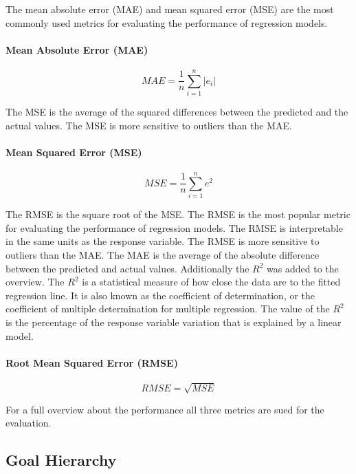 The mean absolute error (MAE) and mean squared error (MSE) are the most commonly used metrics for evaluating the performance of regression models. \paragraph*{Mean Absolute Error (MAE)}

\begin{equation}
    \label{eq:mae}
    MAE = \frac{1}{n} \sum_{i=1}^{n} |e_i|
\end{equation}

The MSE is the average of the squared differences between the predicted and the actual values. The MSE is more sensitive to outliers than the MAE.

\paragraph*{Mean Squared Error (MSE)}

\begin{equation}
    \label{eq:mse}
    MSE = \frac{1}{n} \sum_{i=1}^{n} e^2
\end{equation}

The RMSE is the square root of the MSE. The RMSE is the most popular metric for evaluating the performance of regression models. The RMSE is interpretable in the same units as the response variable. The RMSE is more sensitive to outliers than the MAE.
The MAE is the average of the absolute difference between the predicted and actual values.
Additionally the $R^2$ was added to the overview. The $R^2$ is a statistical measure of how close the data are to the fitted regression line. It is also known as the coefficient of determination, or the coefficient of multiple determination for multiple regression. The value of the $R^2$ is the percentage of the response variable variation that is explained by a linear model.

\paragraph*{Root Mean Squared Error (RMSE)}

\begin{equation}
    \label{eq:rmse}
    RMSE = \sqrt{MSE}
\end{equation}

For a full overview about the performance all three metrics are sued for the evaluation.

\subsection{Goal Hierarchy}

